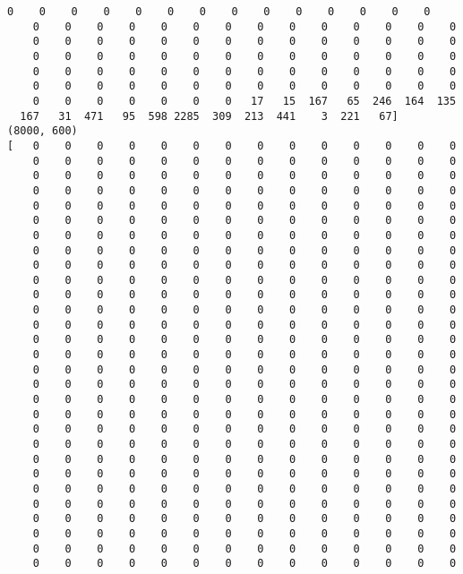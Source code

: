 \documentclass[11pt]{article}
\begin{document}
\begin{Verbatim}[commandchars=\\\{\}]
    0    0    0    0    0    0    0    0    0    0    0    0    0    0
    0    0    0    0    0    0    0    0    0    0    0    0    0    0
    0    0    0    0    0    0    0    0    0    0    0    0    0    0
    0    0    0    0    0    0    0    0    0    0    0    0    0    0
    0    0    0    0    0    0    0    0    0    0    0    0    0    0
    0    0    0    0    0    0    0    0    0    0    0    0    0    0
    0    0    0    0    0    0    0   17   15  167   65  246  164  135
  167   31  471   95  598 2285  309  213  441    3  221   67]
(8000, 600)
[   0    0    0    0    0    0    0    0    0    0    0    0    0    0
    0    0    0    0    0    0    0    0    0    0    0    0    0    0
    0    0    0    0    0    0    0    0    0    0    0    0    0    0
    0    0    0    0    0    0    0    0    0    0    0    0    0    0
    0    0    0    0    0    0    0    0    0    0    0    0    0    0
    0    0    0    0    0    0    0    0    0    0    0    0    0    0
    0    0    0    0    0    0    0    0    0    0    0    0    0    0
    0    0    0    0    0    0    0    0    0    0    0    0    0    0
    0    0    0    0    0    0    0    0    0    0    0    0    0    0
    0    0    0    0    0    0    0    0    0    0    0    0    0    0
    0    0    0    0    0    0    0    0    0    0    0    0    0    0
    0    0    0    0    0    0    0    0    0    0    0    0    0    0
    0    0    0    0    0    0    0    0    0    0    0    0    0    0
    0    0    0    0    0    0    0    0    0    0    0    0    0    0
    0    0    0    0    0    0    0    0    0    0    0    0    0    0
    0    0    0    0    0    0    0    0    0    0    0    0    0    0
    0    0    0    0    0    0    0    0    0    0    0    0    0    0
    0    0    0    0    0    0    0    0    0    0    0    0    0    0
    0    0    0    0    0    0    0    0    0    0    0    0    0    0
    0    0    0    0    0    0    0    0    0    0    0    0    0    0
    0    0    0    0    0    0    0    0    0    0    0    0    0    0
    0    0    0    0    0    0    0    0    0    0    0    0    0    0
    0    0    0    0    0    0    0    0    0    0    0    0    0    0
    0    0    0    0    0    0    0    0    0    0    0    0    0    0
    0    0    0    0    0    0    0    0    0    0    0    0    0    0
    0    0    0    0    0    0    0    0    0    0    0    0    0    0
    0    0    0    0    0    0    0    0    0    0    0    0    0    0
    0    0    0    0    0    0    0    0    0    0    0    0    0    0
    0    0    0    0    0    0    0    0    0    0    0    0    0    0

\end{Verbatim}
\end{document}
